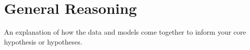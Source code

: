 \section{General Reasoning}
\label{sec:reasoning}

An explanation of how the data and models come together to inform your core hypothesis or hypotheses.